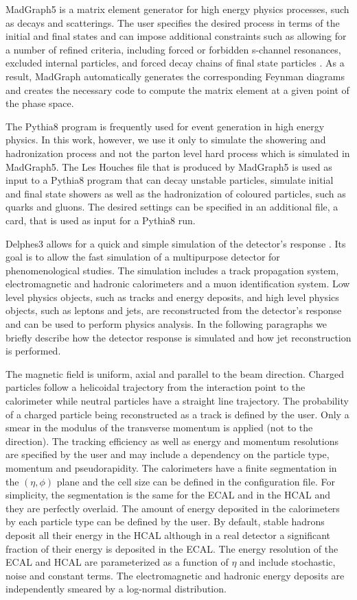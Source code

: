MadGraph5 is a matrix element generator for high energy physics processes, such as decays and scatterings. The user specifies the desired process in terms of the initial and final states and can impose additional constraints such as allowing for a number of refined criteria, including forced or forbidden s-channel resonances, excluded internal particles, and forced decay chains of final state particles \cite{MG5}. As a result, MadGraph automatically generates the corresponding Feynman diagrams and creates the necessary code to compute the matrix element at a given point of the phase space.

The Pythia8 program is frequently used for event generation in high energy physics. In this work, however, we use it only to simulate the showering and hadronization process and not the parton level hard process which is simulated in MadGraph5. The Les Houches file that is produced by MadGraph5 is used as input to a Pythia8 program that can decay unstable particles, simulate initial and final state showers as well as the hadronization of coloured particles, such as quarks and gluons. The desired settings can be specified in an additional file, a card, that is used as input for a Pythia8 run.

Delphes3 allows for a quick and simple simulation of the detector's response \cite{Delphes}. Its goal is to allow the fast simulation of a multipurpose detector for phenomenological studies. The simulation includes a track propagation system, electromagnetic and hadronic calorimeters and a muon identification system. Low level physics objects, such as tracks and energy deposits, and high level physics objects, such as leptons and jets, are reconstructed from the detector's response and can be used to perform physics analysis. In the following paragraphs we briefly describe how the detector response is simulated and how jet reconstruction is performed.  

The magnetic field is uniform, axial and parallel to the beam direction. Charged particles follow a helicoidal trajectory from the interaction point to the calorimeter while neutral particles have a straight line trajectory. The probability of a charged particle being reconstructed as a track is defined by the user. Only a smear in the modulus of the transverse momentum is applied (not to the direction). The tracking efficiency as well as energy and momentum resolutions are specified by the user and may include a dependency on the particle type, momentum and pseudorapidity. The calorimeters have a finite segmentation in the $(\eta,\phi)$ plane and the cell size can be defined in the configuration file. For simplicity, the segmentation is the same for the ECAL and in the HCAL and they are perfectly overlaid. The amount of energy deposited in the calorimeters by each particle type can be defined by the user. By default, stable hadrons deposit all their energy in the HCAL although in a real detector a significant fraction of their energy is deposited in the ECAL. The energy resolution of the ECAL and HCAL are parameterized as a function of $\eta$ and include stochastic, noise and constant terms. The electromagnetic and hadronic energy deposits are independently smeared by a log-normal distribution. 

